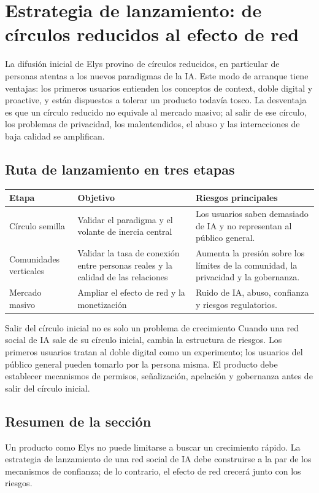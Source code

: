 \section{Estrategia de lanzamiento: de círculos reducidos al efecto de red}

La difusión inicial de Elys provino de círculos reducidos, en particular de personas atentas a los nuevos paradigmas de la IA. Este modo de arranque tiene ventajas: los primeros usuarios entienden los conceptos de context, doble digital y proactive, y están dispuestos a tolerar un producto todavía tosco. La desventaja es que un círculo reducido no equivale al mercado masivo; al salir de ese círculo, los problemas de privacidad, los malentendidos, el abuso y las interacciones de baja calidad se amplifican.

\subsection{Ruta de lanzamiento en tres etapas}

\noindent\begin{tabularx}{\textwidth}{p{}p{}X}
\toprule
Etapa & Objetivo & Riesgos principales \\
\midrule
Círculo semilla & Validar el paradigma y el volante de inercia central & Los usuarios saben demasiado de IA y no representan al público general. \\
Comunidades verticales & Validar la tasa de conexión entre personas reales y la calidad de las relaciones & Aumenta la presión sobre los límites de la comunidad, la privacidad y la gobernanza. \\
Mercado masivo & Ampliar el efecto de red y la monetización & Ruido de IA, abuso, confianza y riesgos regulatorios. \\
\bottomrule
\end{tabularx}

\begin{importantbox}{Salir del círculo inicial no es solo un problema de crecimiento}
Cuando una red social de IA sale de su círculo inicial, cambia la estructura de riesgos. Los primeros usuarios tratan al doble digital como un experimento; los usuarios del público general pueden tomarlo por la persona misma. El producto debe establecer mecanismos de permisos, señalización, apelación y gobernanza antes de salir del círculo inicial.
\end{importantbox}

\subsection{Resumen de la sección}

Un producto como Elys no puede limitarse a buscar un crecimiento rápido. La estrategia de lanzamiento de una red social de IA debe construirse a la par de los mecanismos de confianza; de lo contrario, el efecto de red crecerá junto con los riesgos.
